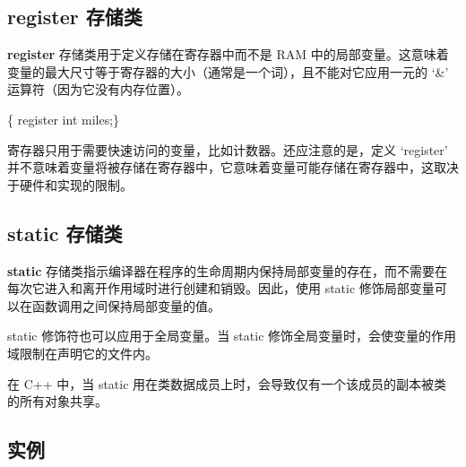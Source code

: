 \documentclass[
]{article}
\newenvironment{Shaded}{}{}
\newcommand{\AttributeTok}[1]{\textcolor[rgb]{0.49,0.56,0.16}{#1}}
\newcommand{\DataTypeTok}[1]{\textcolor[rgb]{0.56,0.13,0.00}{#1}}
\newcommand{\NormalTok}[1]{#1}
\newcommand{\OperatorTok}[1]{\textcolor[rgb]{0.40,0.40,0.40}{#1}}
\begin{document}
\hypertarget{register-ux5b58ux50a8ux7c7b}{%
\subsection{register 存储类}\label{register-ux5b58ux50a8ux7c7b}}

\textbf{register} 存储类用于定义存储在寄存器中而不是 RAM
中的局部变量。这意味着变量的最大尺寸等于寄存器的大小（通常是一个词），且不能对它应用一元的
`\&' 运算符（因为它没有内存位置）。

\begin{Shaded}
\begin{Highlighting}[]
\OperatorTok{\{}  \AttributeTok{register} \DataTypeTok{int}\NormalTok{ miles}\OperatorTok{;\}}
\end{Highlighting}
\end{Shaded}

寄存器只用于需要快速访问的变量，比如计数器。还应注意的是，定义
`register'
并不意味着变量将被存储在寄存器中，它意味着变量可能存储在寄存器中，这取决于硬件和实现的限制。

\hypertarget{static-ux5b58ux50a8ux7c7b}{%
\subsection{static 存储类}\label{static-ux5b58ux50a8ux7c7b}}

\textbf{static}
存储类指示编译器在程序的生命周期内保持局部变量的存在，而不需要在每次它进入和离开作用域时进行创建和销毁。因此，使用
static 修饰局部变量可以在函数调用之间保持局部变量的值。

static 修饰符也可以应用于全局变量。当 static
修饰全局变量时，会使变量的作用域限制在声明它的文件内。

在 C++ 中，当 static
用在类数据成员上时，会导致仅有一个该成员的副本被类的所有对象共享。

\hypertarget{ux5b9eux4f8b-2}{%
\subsection{实例}\label{ux5b9eux4f8b-2}}
\end{document}
